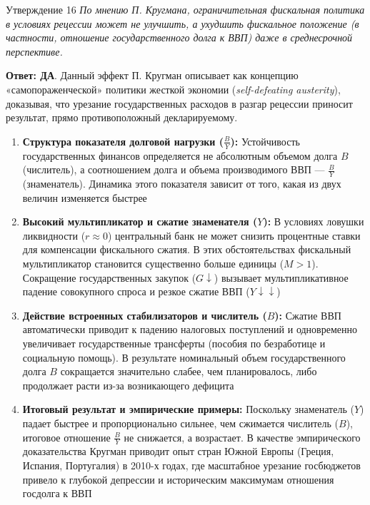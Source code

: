 \documentclass[10pt,a4paper]{article}
\newcommand{\qda}{\textbf{\color{yesgreen}Ответ: ДА}}
\newenvironment{answer}[2]{%
  \begin{qbox}{Утверждение #1}
  \textit{#2}\par\smallskip
}{%
  \end{qbox}\vspace{2pt}
}
\begin{document}
\begin{answer}{16}{По мнению П. Кругмана, ограничительная фискальная политика в условиях рецессии может не улучшить, а ухудшить фискальное положение (в частности, отношение государственного долга к ВВП) даже в среднесрочной перспективе.}
\qda. Данный эффект П. Кругман описывает как концепцию «самопораженческой» политики жесткой экономии (\textit{self-defeating austerity}), доказывая, что урезание государственных расходов в разгар рецессии приносит результат, прямо противоположный декларируемому.

\begin{enumerate}
    \item \textbf{Структура показателя долговой нагрузки ($\frac{B}{Y}$):}
    Устойчивость государственных финансов определяется не абсолютным объемом долга $B$ (числитель), а соотношением долга и объема производимого ВВП — $\frac{B}{Y}$ (знаменатель). Динамика этого показателя зависит от того, какая из двух величин изменяется быстрее

    \item \textbf{Высокий мультипликатор и сжатие знаменателя ($Y$):}
    В условиях ловушки ликвидности ($r \approx 0$) центральный банк не может снизить процентные ставки для компенсации фискального сжатия. В этих обстоятельствах фискальный мультипликатор становится существенно больше единицы ($M > 1$). Сокращение государственных закупок ($G \downarrow$) вызывает мультипликативное падение совокупного спроса и резкое сжатие ВВП ($Y \downarrow\downarrow$)

    \item \textbf{Действие встроенных стабилизаторов и числитель ($B$):}
    Сжатие ВВП автоматически приводит к падению налоговых поступлений и одновременно увеличивает государственные трансферты (пособия по безработице и социальную помощь). В результате номинальный объем государственного долга $B$ сокращается значительно слабее, чем планировалось, либо продолжает расти из-за возникающего дефицита

    \item \textbf{Итоговый результат и эмпирические примеры:}
    Поскольку знаменатель ($Y$) падает быстрее и пропорционально сильнее, чем сжимается числитель ($B$), итоговое отношение $\frac{B}{Y}$ не снижается, а возрастает. В качестве эмпирического доказательства Кругман приводит опыт стран Южной Европы (Греция, Испания, Португалия) в 2010-х годах, где масштабное урезание госбюджетов привело к глубокой депрессии и историческим максимумам отношения госдолга к ВВП
\end{enumerate}
\end{answer}
\end{document}
